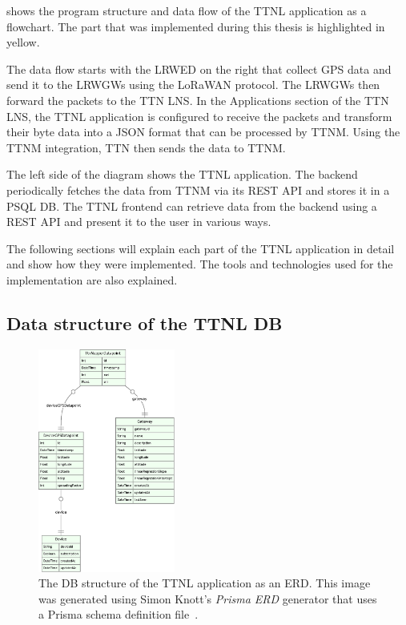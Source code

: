  shows the program structure and data flow of the \ac{TTNL} application as a flowchart.
The part that was implemented during this thesis is highlighted in yellow.

The data flow starts with the \acl{LRWED} on the right that collect \ac{GPS} data and send it to the \aclp{LRWGW} using the \ac{LoRaWAN} protocol.
The \aclp{LRWGW} then forward the packets to the \ac{TTN} \ac{LNS}.
In the Applications section of the \ac{TTN} \ac{LNS}, the \ac{TTNL} application is configured to receive the packets and transform their byte data into a \ac{JSON} format that can be processed by \ac{TTNM}.
Using the \ac{TTNM} integration, \ac{TTN} then sends the data to \ac{TTNM}.

The left side of the diagram shows the \ac{TTNL} application.
The backend periodically fetches the data from \ac{TTNM} via its \ac{REST} \ac{API} and stores it in a \ac{PSQL} \ac{DB}.
The \ac{TTNL} frontend can retrieve data from the backend using a \ac{REST} \ac{API} and present it to the user in various ways.

The following sections will explain each part of the \ac{TTNL} application in detail and show how they were implemented.
The tools and technologies used for the implementation are also explained.

\subsection{Data structure of the \acl{TTNL} \acl{DB}}

\begin{figure}[htbp]
    \centering
    \includegraphics[width=0.4\textwidth]{pictures/ttn-locator/backend/prisma-erd.eps}
    \caption{
        The \ac{DB} structure of the \ac{TTNL} application as an \ac{ERD}.
        This image was generated using Simon Knott's \emph{Prisma ERD} generator that uses a Prisma schema definition file~\cite{simon_knott_prisma_2023}.
    }\label{pic:prisma-erd}
\end{figure}

